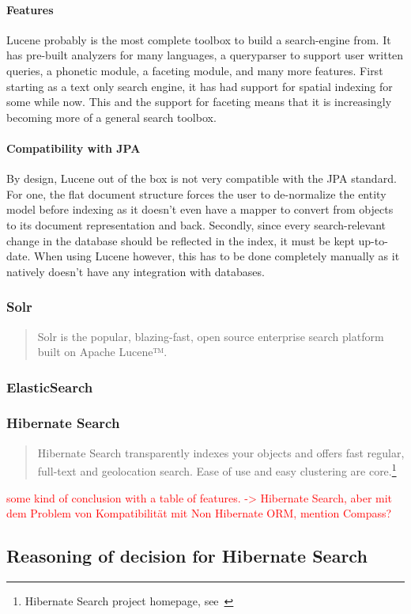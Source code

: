 \paragraph{Features}
Lucene probably is the most complete toolbox to build a search-engine from. It has pre-built analyzers for many languages, a queryparser to support user written queries, a phonetic module, a faceting module, and many more features. First starting as a text only search engine, it has had support for spatial indexing for some while now. This and the support for faceting means that it is increasingly becoming more of a general search toolbox.

\paragraph{Compatibility with JPA}
By design, Lucene out of the box is not very compatible with the JPA standard. For one, the flat document structure forces the user to de-normalize the entity model before indexing as it doesn't even have a mapper to convert from objects to its document representation and back. Secondly, since every search-relevant change in the database should be reflected in the index, it must be kept up-to-date. When using Lucene however, this has to be done completely manually as it natively doesn't have any integration with databases.

\subsubsection{Solr}

\begin{quote}
	Solr is the popular, blazing-fast, open source enterprise search platform built on Apache Lucene™.
\end{quote}

\subsubsection{ElasticSearch}

\subsubsection{Hibernate Search}

\begin{quote}
Hibernate Search transparently indexes your objects and offers fast regular, full-text and geolocation search. Ease of use and easy clustering are core.\footnote{Hibernate Search project homepage, see~\cite{hibernate_search_homepage}}
\end{quote}

\textcolor{red}{some kind of conclusion with a table of features. -> Hibernate Search, aber mit dem Problem von Kompatibilität mit Non Hibernate ORM, mention Compass?}

\subsection{Reasoning of decision for Hibernate Search}

\pagebreak
